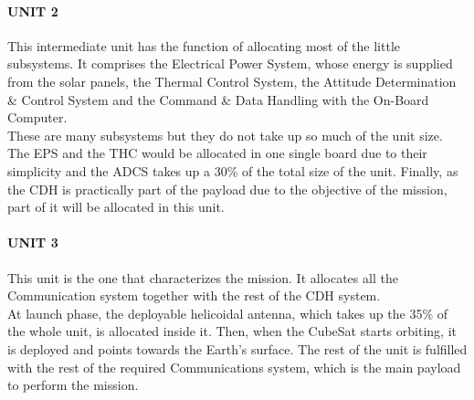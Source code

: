 \paragraph{UNIT 2}
This intermediate unit has the function of allocating most of the little subsystems.
It comprises the Electrical Power System, whose energy is supplied from the solar
panels, the Thermal Control System, the Attitude Determination \& Control System
and the Command \& Data Handling with the On-Board Computer.\\
These are many subsystems but they do not take up so much of the unit size. The
EPS and the THC would be allocated in one single board due to their simplicity
and the ADCS takes up a 30\% of the total size of the unit. Finally, as the
CDH is practically part of the payload due to the objective of the mission,
part of it will be allocated in this unit.\\

\paragraph{UNIT 3}
This unit is the one that characterizes the mission. It allocates all the
Communication system together with the rest of the CDH system.\\
At launch phase, the deployable helicoidal antenna, which takes up the
35\% of the whole unit, is allocated inside it. Then, when the CubeSat starts
orbiting, it is deployed and points towards the Earth’s surface. The rest of the
unit is fulfilled with the rest of the required Communications system, which is
the main payload to perform the mission.\\
